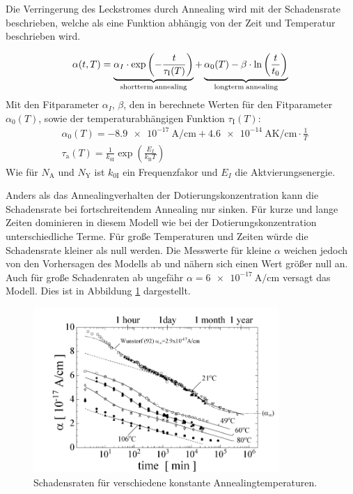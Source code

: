 Die Verringerung des Leckstromes durch Annealing wird mit der Schadensrate
beschrieben, welche als eine Funktion abhängig von der Zeit und
Temperatur beschrieben wird.\cite{moll}

\begin{align}
  \alpha(t, T) = \underbrace{\alpha_I \cdot \exp{\left(-\frac{t}{\tau_{\mathrm{I}}(T)}\right)}}_{\mathrm{shortterm \: annealing}} + \underbrace{\alpha_{\mathrm{0}}(T) -\beta \cdot \ln{\left(\frac{t}{t_{\mathrm{0}}}\right)}}_{\mathrm{longterm \: annealing}} \text{\label{eqn:damage}}
\end{align}
Mit den Fitparameter $\alpha_I$,  $\beta$, den in \cite{moll} berechnete Werten für den Fitparameter $\alpha_{\mathrm{0}}(T)$, sowie der
temperaturabhängigen Funktion $\tau_{\mathrm{I}}(T)$:
\begin{align}
  &\alpha_{\mathrm{0}}(T) = \SI{-8.9e-17}{\ampere\per\centi\meter} + \SI{4.6e-14}{\ampere\kelvin\per\centi\meter} \cdot \frac{1}{T} \\
  &\tau_{\mathrm{a}}(T) = \frac{1}{k_{0\mathrm{I}}}\exp{\left(\frac{E_{I}}{k_{\mathrm{B}}T}\right)}
\end{align}
Wie für $N_{\mathrm{A}}$ und $N_{\mathrm{Y}}$ ist $k_{0\mathrm{I}}$ ein Frequenzfakor und $E_{I}$ die Aktvierungsenergie.

Anders als das Annealingverhalten der Dotierungskonzentration kann die Schadensrate
bei fortschreitendem Annealing nur sinken. Für kurze und
lange Zeiten dominieren in diesem Modell wie bei der Dotierungskonzentration unterschiedliche
Terme. Für große Temperaturen und Zeiten würde die Schadensrate kleiner als null
werden. Die Messwerte für kleine $\alpha$ weichen jedoch von den
Vorhersagen des Modells ab und nähern sich einen Wert größer null an. Auch für große Schadenraten ab ungefähr $\alpha=\SI{6e-17}{\ampere\per\centi\meter}$
versagt das Modell.
Dies ist in Abbildung \ref{fig:damage_rates} dargestellt.

\begin{figure}
  \includegraphics[width=0.83\textwidth]{logos/schadensraten.PNG}
  \caption{Schadensraten für verschiedene konstante Annealingtemperaturen.\cite{moll}}
  \label{fig:damage_rates}
\end{figure}
